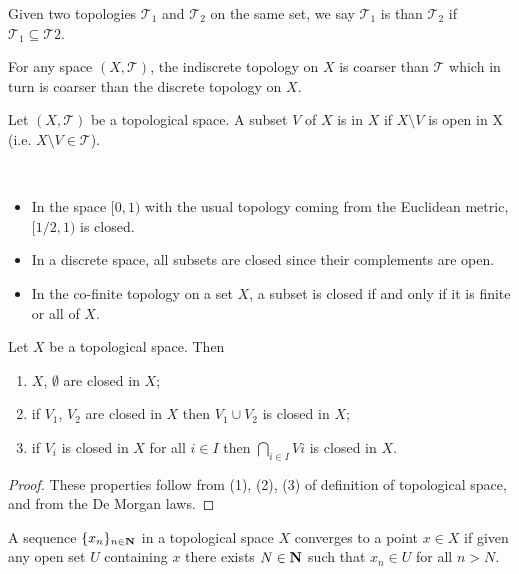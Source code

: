 \begin{definition}
Given two topologies $\mathcal{T}_1$ and $\mathcal{T}_2$ on the same set, we say $\mathcal{T}_1$ is  than $\mathcal{T}_2$ if $\mathcal{T}_1\subseteq\mathcal{T}2$.
\end{definition}

\begin{remark}
For any space $(X,\mathcal{T})$, the indiscrete topology on $X$ is coarser than $\mathcal{T}$ which in turn is coarser than the discrete topology on $X$.
\end{remark}

\begin{definition}
Let $(X,\mathcal{T})$ be a topological space. A subset $V$ of $X$ is  in $X$ if $X\setminus V$ is open in X (i.e. $X\setminus V\in\mathcal{T}$).
\end{definition}

\begin{example} \
\begin{itemize}
\item In the space $[0,1)$ with the usual topology coming from the Euclidean metric, $[1/2,1)$ is closed.
\item In a discrete space, all subsets are closed since their complements are open.
\item In the co-finite topology on a set $X$, a subset is closed if and only if it is finite or all of $X$.
\end{itemize}
\end{example}

\begin{proposition}
Let $X$ be a topological space. Then
\begin{enumerate}[label=(\arabic*)]
\item $X$, $\emptyset$ are closed in $X$;
\item if $V_1$, $V_2$ are closed in $X$ then $V_1\cup V_2$ is closed in $X$;
\item if $V_i$ is closed in $X$ for all $i\in I$ then $\bigcap_{i\in I}Vi$ is closed in $X$.
\end{enumerate}
\end{proposition}

\begin{proof}
These properties follow from (1), (2), (3) of definition of topological space, and from the De Morgan laws.
\end{proof}

\begin{definition}
A sequence $\{x_n\}_{n\in\mathbf N}$ in a topological space $X$ converges to a point $x\in X$ if given any open set $U$ containing $x$ there exists $N\in\mathbf N$ such that $x_n\in U$ for all $n>N$.
\end{definition}

